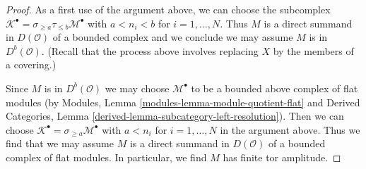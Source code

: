 \begin{proof}
\medskip\noindent
As a first use of the argument above, we can choose the subcomplex
$\mathcal{K}^\bullet = \sigma_{\geq a} \tau_{\leq b}\mathcal{M}^\bullet$
with $a < n_i < b$ for $i = 1, \ldots, N$. Thus $M$ is a direct
summand in $D(\mathcal{O})$ of a bounded complex and we conclude
we may assume $M$ is in $D^b(\mathcal{O})$. (Recall that the process
above involves replacing $X$ by the members of a covering.)

\medskip\noindent
Since $M$ is in $D^b(\mathcal{O})$ we may choose
$\mathcal{M}^\bullet$ to be a bounded above complex of
flat modules (by Modules, Lemma \ref{modules-lemma-module-quotient-flat} and
Derived Categories, Lemma \ref{derived-lemma-subcategory-left-resolution}).
Then we can choose $\mathcal{K}^\bullet = \sigma_{\geq a}\mathcal{M}^\bullet$
with $a < n_i$ for $i = 1, \ldots, N$ in the argument above.
Thus we find that we may assume $M$ is a direct summand in
$D(\mathcal{O})$ of a bounded complex of flat modules.
In particular, we find $M$ has finite tor amplitude.


\end{proof}
